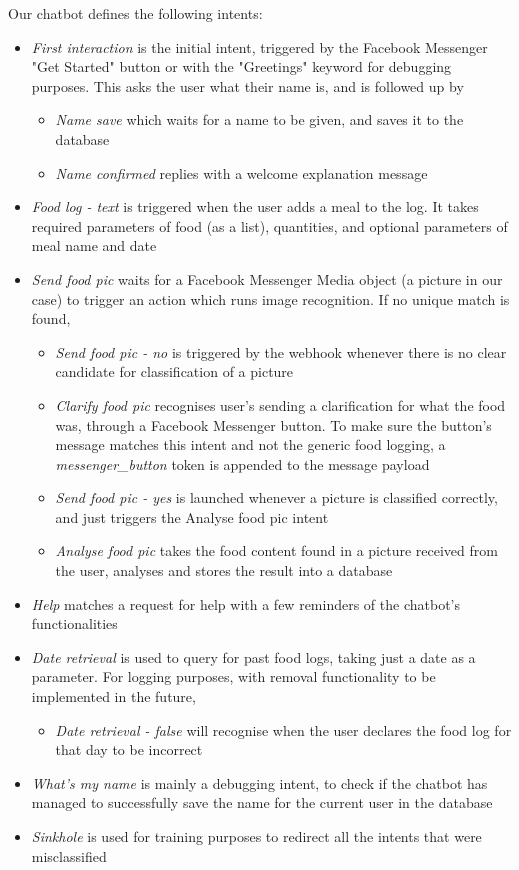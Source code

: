 Our chatbot defines the following intents:
\begin{itemize}
  \item \textit{First interaction} is the initial intent, triggered by the Facebook Messenger "Get Started" button or with the "Greetings" keyword for debugging purposes. This asks the user what their name is, and is followed up by 
  \begin{itemize}
  	\item \textit{Name save} which waits for a name to be given, and saves it to the database
        \item \textit{Name confirmed} replies with a welcome explanation message
  \end{itemize}
  \item \textit{Food log - text} is triggered when the user adds a meal to the log. It takes required parameters of food (as a list), quantities, and optional parameters of meal name and date
  \item \textit{Send food pic} waits for a Facebook Messenger Media object (a picture in our case) to trigger an action which runs image recognition. If no unique match is found, 
  \begin{itemize}
    \item \textit{Send food pic - no} is triggered by the webhook whenever there is no clear candidate for classification of a picture
    \item \textit{Clarify food pic} recognises user's sending a clarification for what the food was, through a Facebook Messenger button. To make sure the button's message matches this intent and not the generic food logging, a \textit{messenger\_button} token is appended to the message payload
  \end{itemize}
  \begin{itemize}
    \item \textit{Send food pic - yes} is launched whenever a picture is classified correctly, and just triggers the Analyse food pic intent
    \item \textit{Analyse food pic} takes the food content found in a picture received from the user, analyses and stores the result into a database
  \end{itemize}
  \item \textit{Help} matches a request for help with a few reminders of the chatbot's functionalities
  \item \textit{Date retrieval} is used to query for past food logs, taking just a date as a parameter. For logging purposes, with removal functionality to be implemented in the future,
  \begin{itemize}
        \item \textit{Date retrieval - false} will recognise when the user declares the food log for that day to be incorrect
  \end{itemize}
  \item \textit{What's my name} is mainly a debugging intent, to check if the chatbot has managed to successfully save the name for the current user in the database
  \item \textit{Sinkhole} is used for training purposes to redirect all the intents that were misclassified
\end{itemize}
